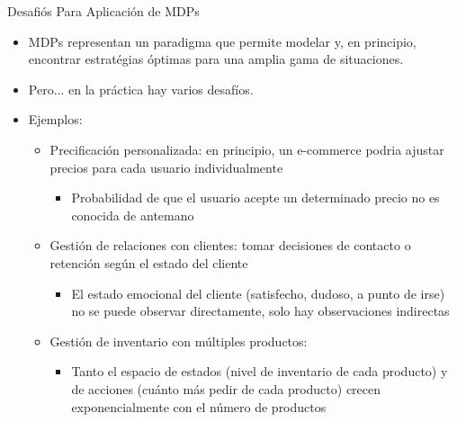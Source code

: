 \documentclass[handout]{beamer}
\begin{document}
\begin{frame}{Desafiós Para Aplicación de MDPs}
\begin{itemize}
\item MDPs representan un paradigma que permite modelar y, en principio, encontrar estratégias óptimas para una amplia gama de situaciones.
\item<2-> Pero... en la práctica hay varios desafíos.
\item<3-> Ejemplos:
\begin{itemize}
\item<4-> Precificación personalizada: en principio, un e-commerce podria ajustar precios para cada usuario individualmente
\begin{itemize}
\item<5-> Probabilidad de que el usuario acepte un determinado precio no es conocida de antemano
\end{itemize}
\item<6-> Gestión de relaciones con clientes: tomar decisiones de contacto o retención según el estado del cliente
\begin{itemize}
\item<7-> El estado emocional del cliente (satisfecho, dudoso, a punto de irse) no se puede observar directamente, solo hay observaciones indirectas
\end{itemize}
\item<8-> Gestión de inventario con múltiples productos:
\begin{itemize}
\item<9-> Tanto el espacio de estados (nivel de inventario de cada producto) y de acciones (cuánto más pedir de cada producto) crecen exponencialmente con el número de productos
\end{itemize}
\end{itemize}
\end{itemize}
\end{frame}
\end{document}
